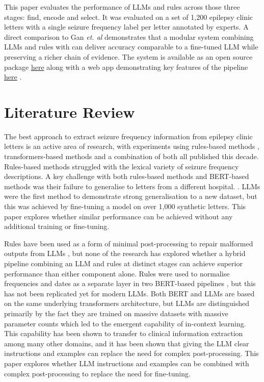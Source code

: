 \documentclass[conference]{IEEEtran}
\begin{document}
This paper evaluates the performance of LLMs and 
rules across those three stages: find, encode and select. 
It was evaluated on a set of 1,200 epilepsy clinic letters 
with a single seizure frequency label per letter annotated
by experts. A direct comparison to Gan \emph{et. al}\cite{b3} 
demonstrates that a modular system combining LLMs and 
rules with can deliver accuracy comparable to a fine-tuned 
LLM while preserving a richer chain of evidence. The 
system is available as an open source package \href{https://github.com/cbrown564-alt/clinical_extraction}{here} 
along with a web app demonstrating key features of
the pipeline \href{https://clinical-extraction.vercel.app/workbench}{here} .

\section{Literature Review}

The best approach to extract seizure frequency 
information from epilepsy clinic letters is an active area 
of research, with experiments using rules-based methods \cite{b4, b6}, 
transformers-based methods \cite{b3, b5, b7, b8} and a 
combination of both \cite{b9, b10} all published this decade. 
Rules-based methods struggled with the 
lexical variety of seizure frequency descriptions. A key 
challenge with both rules-based methods and BERT-based 
methods was their failure to generalise to letters from a 
different hospital. \cite{b6, b10}. LLMs were the first method
to demonstrate strong generalisation to a new dataset\cite{b3},
but this was achieved by fine-tuning a model on over 1,000
synthetic letters. This paper explores whether similar
performance can be achieved without any additional 
training or fine-tuning.

Rules have been used as a form of minimal post-processing 
to repair malformed outputs from LLMs \cite{b5}, but none of 
the research has explored whether a hybrid pipeline combining 
an LLM and rules at distinct stages can achieve superior 
performance than either component alone. Rules were used 
to normalise frequencies and dates as a separate layer in two
BERT-based pipelines \cite{b9, b10}, but this has not been 
replicated yet for modern LLMs. Both BERT and LLMs are 
based on the same underlying transformers architecture, but
LLMs are distinguished primarily by the fact they are trained
on massive datasets with massive parameter counts which 
led to the emergent capability of in-context learning\cite{b11}.
This capability has been shown to transfer to clinical information
extraction among many other domains, and it has been shown
that giving the LLM clear instructions and examples can replace
the need for complex post-processing\cite{b12}. This paper 
explores whether LLM instructions and examples can be 
combined with complex post-processing to replace the need 
for fine-tuning.
\end{document}
